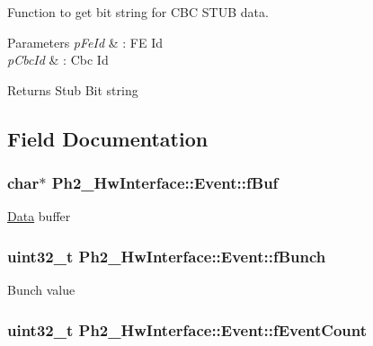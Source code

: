 Function to get bit string for C\-B\-C S\-T\-U\-B data. 


\begin{DoxyParams}{Parameters}
{\em p\-Fe\-Id} & \-: F\-E Id \\
\hline
{\em p\-Cbc\-Id} & \-: Cbc Id \\
\hline
\end{DoxyParams}
\begin{DoxyReturn}{Returns}
Stub Bit string 
\end{DoxyReturn}


\subsection{Field Documentation}
\hypertarget{class_ph2___hw_interface_1_1_event_ab396cf1480f11b535d0e464aa6f9f046}{
\subsubsection[{f\-Buf}]{\setlength{\rightskip}{0pt plus 5cm}char$\ast$ Ph2\-\_\-\-Hw\-Interface\-::\-Event\-::f\-Buf\hspace{0.3cm}{\ttfamily [private]}}}\label{class_ph2___hw_interface_1_1_event_ab396cf1480f11b535d0e464aa6f9f046}
\hyperlink{class_ph2___hw_interface_1_1_data}{Data} buffer \hypertarget{class_ph2___hw_interface_1_1_event_ae5b69f2e0a9c9c947f7a37b7dcf380dc}{
\subsubsection[{f\-Bunch}]{\setlength{\rightskip}{0pt plus 5cm}uint32\-\_\-t Ph2\-\_\-\-Hw\-Interface\-::\-Event\-::f\-Bunch\hspace{0.3cm}{\ttfamily [private]}}}\label{class_ph2___hw_interface_1_1_event_ae5b69f2e0a9c9c947f7a37b7dcf380dc}
Bunch value \hypertarget{class_ph2___hw_interface_1_1_event_add8f3a445ae11e54b47af7690074a4ce}{
\subsubsection[{f\-Event\-Count}]{\setlength{\rightskip}{0pt plus 5cm}uint32\-\_\-t Ph2\-\_\-\-Hw\-Interface\-::\-Event\-::f\-Event\-Count\hspace{0.3cm}{\ttfamily [private]}}}\label{class_ph2___hw_interface_1_1_event_add8f3a445ae11e54b47af7690074a4ce}
